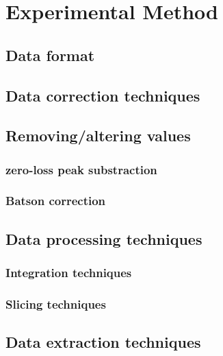 \section{Experimental Method}
\subsection{Data format}
\subsection{Data correction techniques}
\subsection{Removing/altering values}
\subsubsection{zero-loss peak substraction}
\subsubsection{Batson correction}
\subsection{Data processing techniques}
\subsubsection{Integration techniques}
\subsubsection{Slicing techniques}
\subsection{Data extraction techniques}
